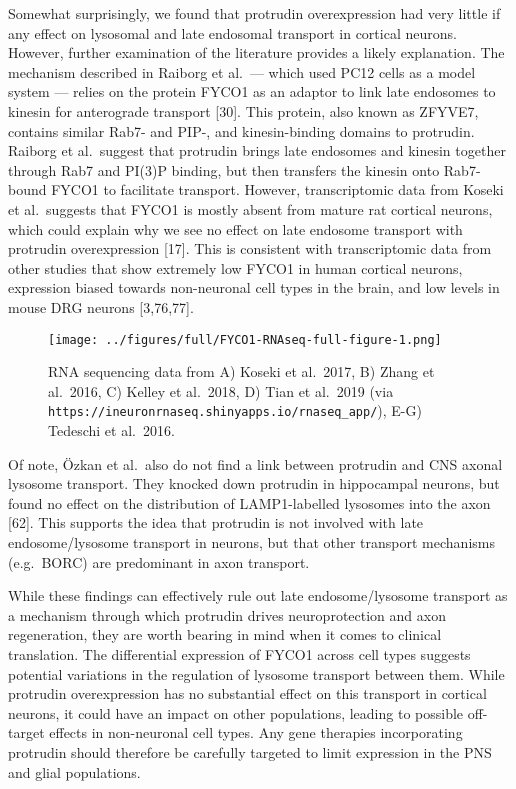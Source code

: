 \documentclass[
  12pt,
  a4paper,
]{book}
\begin{document}
Somewhat surprisingly, we found that protrudin overexpression had very little if any effect on lysosomal and late endosomal transport in cortical neurons. However, further examination of the literature provides a likely explanation. The mechanism described in Raiborg et al.~--- which used PC12 cells as a model system --- relies on the protein FYCO1 as an adaptor to link late endosomes to kinesin for anterograde transport {[}30{]}. This protein, also known as ZFYVE7, contains similar Rab7- and PIP-, and kinesin-binding domains to protrudin. Raiborg et al.~suggest that protrudin brings late endosomes and kinesin together through Rab7 and PI(3)P binding, but then transfers the kinesin onto Rab7-bound FYCO1 to facilitate transport. However, transcriptomic data from Koseki et al.~suggests that FYCO1 is mostly absent from mature rat cortical neurons, which could explain why we see no effect on late endosome transport with protrudin overexpression {[}17{]}. This is consistent with transcriptomic data from other studies that show extremely low FYCO1 in human cortical neurons, expression biased towards non-neuronal cell types in the brain, and low levels in mouse DRG neurons {[}3,76,77{]}.

\begin{figure}
\centering
\texttt{[image: ../figures/full/FYCO1-RNAseq-full-figure-1.png]}
\caption{\label{fig:FYCO1-RNAseq-full-figure}RNA sequencing data from A) Koseki et al.~2017, B) Zhang et al.~2016, C) Kelley et al.~2018, D) Tian et al.~2019 (via \texttt{https://ineuronrnaseq.shinyapps.io/rnaseq\_app/}), E-G) Tedeschi et al.~2016.}
\end{figure}

Of note, Özkan et al.~also do not find a link between protrudin and CNS axonal lysosome transport. They knocked down protrudin in hippocampal neurons, but found no effect on the distribution of LAMP1-labelled lysosomes into the axon {[}62{]}. This supports the idea that protrudin is not involved with late endosome/lysosome transport in neurons, but that other transport mechanisms (e.g.~BORC) are predominant in axon transport.

While these findings can effectively rule out late endosome/lysosome transport as a mechanism through which protrudin drives neuroprotection and axon regeneration, they are worth bearing in mind when it comes to clinical translation. The differential expression of FYCO1 across cell types suggests potential variations in the regulation of lysosome transport between them. While protrudin overexpression has no substantial effect on this transport in cortical neurons, it could have an impact on other populations, leading to possible off-target effects in non-neuronal cell types. Any gene therapies incorporating protrudin should therefore be carefully targeted to limit expression in the PNS and glial populations.
\end{document}
